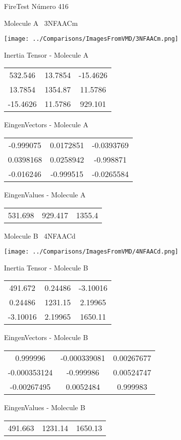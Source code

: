 \vtab[-3cm]
\begin{center}
{\large FireTest \tab Número 416}
\end{center}
\begin{multicols}{2}
\begin{center}

Molecule A \
3NFAACm

\texttt{[image: ../Comparisons/ImagesFromVMD/3NFAACm.png]}

Inertia Tensor - Molecule A \\
\begin{tabular}{|c c c|}
532.546	 & 	13.7854	 & 	-15.4626	 \\
13.7854	 & 	1354.87	 & 	11.5786	 \\
-15.4626	 & 	11.5786	 & 	929.101
\end{tabular}

\vtab
 EingenVectors - Molecule A     \\
\begin{tabular}{|c c c|}
-0.999075	 & 	0.0172851	 & 	-0.0393769	 \\
0.0398168	 & 	0.0258942	 & 	-0.998871	 \\
-0.016246	 & 	-0.999515	 & 	-0.0265584
\end{tabular}

\vtab
 EingenValues - Molecule A     \\
\begin{tabular}{|c c c|}
531.698	 & 	929.417	 & 	1355.4	 \\
\end{tabular}
\columnbreak

Molecule B \
4NFAACd

\texttt{[image: ../Comparisons/ImagesFromVMD/4NFAACd.png]}

Inertia Tensor - Molecule B \\
\begin{tabular}{|c c c|}
491.672	 & 	0.24486	 & 	-3.10016	 \\
0.24486	 & 	1231.15	 & 	2.19965	 \\
-3.10016	 & 	2.19965	 & 	1650.11
\end{tabular}

\vtab
 EingenVectors - Molecule B     \\
\begin{tabular}{|c c c|}
0.999996	 & 	-0.000339081	 & 	0.00267677	 \\
-0.000353124	 & 	-0.999986	 & 	0.00524747	 \\
-0.00267495	 & 	0.0052484	 & 	0.999983
\end{tabular}

\vtab
 EingenValues - Molecule B     \\
\begin{tabular}{|c c c|}
491.663	 & 	1231.14	 & 	1650.13	 \\
\end{tabular}

\end{center}
\end{multicols}

